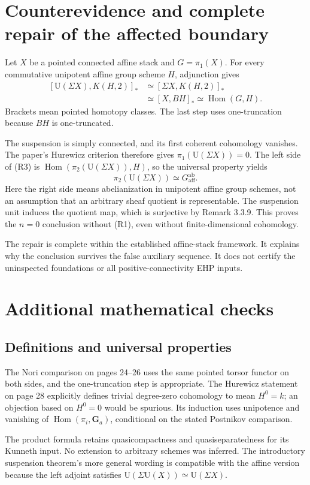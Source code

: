 \documentclass[10pt]{article}
\begin{document}
\section*{Counterevidence and complete repair of the affected boundary}
Let \(X\) be a pointed connected affine stack and \(G=\pi_1(X)\). For every commutative unipotent affine group scheme \(H\), adjunction gives \[\begin{split}
 [\mathrm U(\Sigma X),K(H,2)]_*
 &\simeq[\Sigma X,K(H,2)]_*\\
 &\simeq[X,BH]_*
 \simeq\operatorname{Hom}(G,H).
\end{split}\tag{R3}\] Brackets mean pointed homotopy classes. The last step uses one-truncation because \(BH\) is one-truncated.\par
The suspension is simply connected, and its first coherent cohomology vanishes. The paper’s Hurewicz criterion therefore gives \(\pi_1(\mathrm U(\Sigma X))=0\). The left side of (R3) is \(\operatorname{Hom}(\pi_2(\mathrm U(\Sigma X)),H)\), so the universal property yields \[\pi_2(\mathrm U(\Sigma X))\simeq G^{\mathrm{ab}}_{\mathrm{aff}}.\] Here the right side means abelianization in unipotent affine group schemes, not an assumption that an arbitrary sheaf quotient is representable. The suspension unit induces the quotient map, which is surjective by Remark 3.3.9. This proves the \(n=0\) conclusion without (R1), even without finite-dimensional cohomology.\par
The repair is complete within the established affine-stack framework. It explains why the conclusion survives the false auxiliary sequence. It does not certify the uninspected foundations or all positive-connectivity EHP inputs.\par
\section*{Additional mathematical checks}
\subsection*{Definitions and universal properties}
The Nori comparison on pages 24–26 uses the same pointed torsor functor on both sides, and the one-truncation step is appropriate. The Hurewicz statement on page 28 explicitly defines trivial degree-zero cohomology to mean \(H^0=k\); an objection based on \(H^0=0\) would be spurious. Its induction uses unipotence and vanishing of \(\operatorname{Hom}(\pi_i,\mathbf G_a)\), conditional on the stated Postnikov comparison.\par
The product formula retains quasicompactness and quasiseparatedness for its Kunneth input. No extension to arbitrary schemes was inferred. The introductory suspension theorem’s more general wording is compatible with the affine version because the left adjoint satisfies \(\mathrm U(\Sigma\mathrm U(X))\simeq\mathrm U(\Sigma X)\).\par
\end{document}
